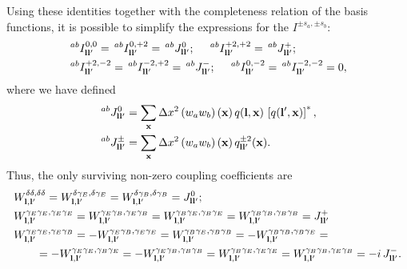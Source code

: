 \documentclass[a4paper,11pt]{article}
\newcommand{\summ}[1]{\sum_{\bf #1}\Delta #1^2}
\begin{document}
      Using these identities together with the completeness relation of the basis functions, it is possible to simplify the expressions for the $I^{\pm s_a,\pm s_b}$:
      \begin{align}
        &\,^{ab}I^{0,0}_{{\bf l}{\bf l}'}=\,^{ab}I^{0,+2}_{{\bf l}{\bf l}'}=\,^{ab}J^0_{{\bf l}{\bf l}'}; \hspace{12pt}
        \,^{ab}I^{+2,+2}_{{\bf l}{\bf l}'}=\,^{ab}J^+_{{\bf l}{\bf l}'};\\
        &\,^{ab}I^{+2,-2}_{{\bf l}{\bf l}'}=\,^{ab}I^{-2,+2}_{{\bf l}{\bf l}'}=\,^{ab}J^-_{{\bf l}{\bf l}'}; \hspace{12pt}
        \,^{ab}I^{0,-2}_{{\bf l}{\bf l}'}=\,^{ab}I^{-2,-2}_{{\bf l}{\bf l}'}=0,
      \end{align}
      where  we have defined
      \begin{align}\label{eq:covar_coupling_J}
        &\,^{ab}J^0_{{\bf l}{\bf l}'}=\summ{x}\left(w_a w_b\right)({\bf x})\,q({\bf l},{\bf x})\,\left[q({\bf l}',{\bf x})\right]^*,\\
        &\,^{ab}J^\pm_{{\bf l}{\bf l}'}=\summ{x}\left(w_a w_b\right)({\bf x})\,q^{\pm2}_{{\bf l}{\bf l}'}({\bf x}).
      \end{align}
      Thus, the only surviving non-zero coupling coefficients are
      \begin{align}
        &W^{\delta\delta,\delta\delta}_{{\bf l},{\bf l}'}=W^{\delta\gamma_E,\delta\gamma_E}_{{\bf l},{\bf l}'}=W^{\delta\gamma_B,\delta\gamma_B}_{{\bf l},{\bf l}'}=J^0_{{\bf l}{\bf l}'};\\
        &W^{\gamma_E\gamma_E,\gamma_E\gamma_E}_{{\bf l},{\bf l}'}=W^{\gamma_E\gamma_B,\gamma_E\gamma_B}_{{\bf l},{\bf l}'}=W^{\gamma_B\gamma_E,\gamma_B\gamma_E}_{{\bf l},{\bf l}'}=W^{\gamma_B\gamma_B,\gamma_B\gamma_B}_{{\bf l},{\bf l}'}=J^+_{{\bf l}{\bf l}'}\\\nonumber
        &W^{\gamma_E\gamma_E,\gamma_E\gamma_B}_{{\bf l},{\bf l}'}=-W^{\gamma_E\gamma_B,\gamma_E\gamma_E}_{{\bf l},{\bf l}'}=W^{\gamma_B\gamma_E,\gamma_B\gamma_B}_{{\bf l},{\bf l}'}=-W^{\gamma_B\gamma_B,\gamma_B\gamma_E}_{{\bf l},{\bf l}'}=\\
        &\hspace{20pt}=-W^{\gamma_E\gamma_E,\gamma_B\gamma_E}_{{\bf l},{\bf l}'}=-W^{\gamma_E\gamma_B,\gamma_B\gamma_B}_{{\bf l},{\bf l}'}=W^{\gamma_B\gamma_E,\gamma_E\gamma_E}_{{\bf l},{\bf l}'}=W^{\gamma_B\gamma_B,\gamma_E\gamma_B}_{{\bf l},{\bf l}'}=-i\,J^-_{{\bf l}{\bf l}'}.
      \end{align}
    
\end{document}
